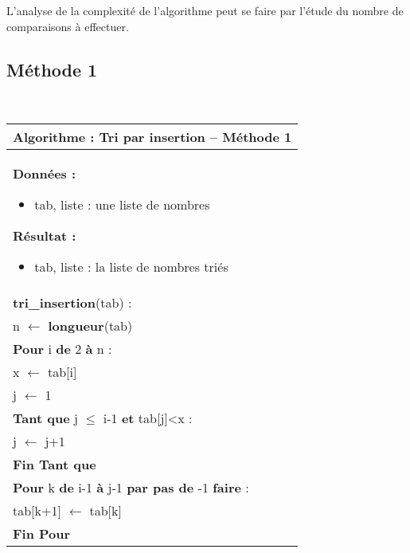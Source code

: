 \documentclass[10pt,fleqn]{article} %
\newcommand{\tsf}[1]{\small{\textsf{#1}}}
\begin{document}
L'analyse de la complexité de l'algorithme peut se faire par l'étude du nombre de comparaisons à effectuer.
\subsection{Méthode 1}

\begin{pseudo}
~\\
\begin{minipage}[c]{.48\linewidth}
\begin{tabular}{p{}}
\hline
\textbf{Algorithme :} Tri par insertion -- Méthode 1\\
\hline
\textbf{Données :}
\begin{itemize}
\item \tsf{tab}, liste : une liste de nombres
\end{itemize}
\textbf{Résultat :} 
\begin{itemize}
\item \tsf{tab}, liste : la liste de nombres triés
\end{itemize}
\\
\textbf{tri\_insertion}(\tsf{tab}) :\\
\hspace{.4cm} \tsf{n} $\leftarrow$ \textbf{longueur}(\tsf{tab}) \\
\hspace{.4cm}\textbf{Pour} \tsf{i} \textbf{de} 2 \textbf{à} \tsf{n} : \\
\hspace{.8cm} \tsf{x} $\leftarrow$ \tsf{tab[i]} \\
\hspace{.8cm} \tsf{j} $\leftarrow$ \tsf{1} \\
\hspace{.8cm}\textbf{Tant que} \tsf{j $\leq$ i-1} \textbf{et} \tsf{tab[j]<x}  : \\
\hspace{1.2cm} \tsf{j} $\leftarrow$ \tsf{j+1} \\
\hspace{.8cm}\textbf{Fin Tant que} \\
\hspace{.8cm}\textbf{Pour} \tsf{k} \textbf{de} \tsf{i-1} \textbf{à} \tsf{j-1} \textbf{par pas de} \tsf{-1} \textbf{faire} : \\
\hspace{1.2cm} \tsf{tab[k+1]} $\leftarrow$ \tsf{tab[k]} \\
\hspace{.8cm} \textbf{Fin Pour} \\

\end{tabular}
\end{minipage}
\end{pseudo}
\end{document}
